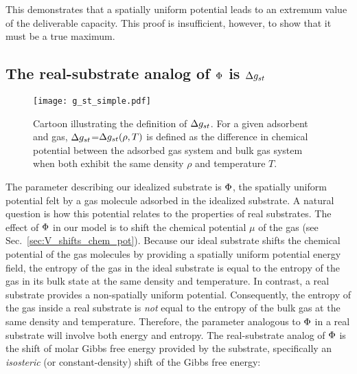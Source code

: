 This demonstrates that a spatially uniform potential leads to an extremum value
of the deliverable capacity. This proof is insufficient, however, to show that
it must be a true maximum.

\subsection{The real-substrate analog of $\Phi$ is $\Delta g_{st}$}
\label{sec:phi-is-delta-g}
\begin{figure}
    \centering
    \texttt{[image: g\_st\_simple.pdf]}
    \caption{Cartoon illustrating the definition of $\Delta g_{st}$. For a given adsorbent and gas, $\Delta g_{st}$=$\Delta g_{st} (\rho, T)$ is defined as the difference in chemical potential between the adsorbed gas system and bulk gas system when both exhibit the same density $\rho$ and temperature $T$.}
    \label{fig:delta-G-cartoon}
\end{figure}

The parameter describing our idealized substrate is $\Phi$, the spatially uniform
potential felt by a gas molecule adsorbed in the idealized substrate. A natural
question is how this potential relates to the properties of real substrates.
The effect of $\Phi$ in our model is to shift the chemical potential $\mu$ of the
gas (see Sec.~\ref{sec:V_shifts_chem_pot}). Because our ideal substrate shifts
the chemical potential of the gas molecules by providing a spatially uniform
potential energy field, the entropy of the gas in the ideal substrate is equal
to the entropy of the gas in its bulk state at the same density and
temperature. In contrast, a real substrate provides a non-spatially uniform
potential. Consequently, the entropy of the gas inside a real substrate is
\emph{not} equal to the entropy of the bulk gas at the same density and
temperature. Therefore, the parameter analogous to $\Phi$ in a real substrate
will involve both energy and entropy. The real-substrate analog of $\Phi$ is the
shift of molar Gibbs free energy provided by the substrate, specifically an
\emph{isosteric} (or constant-density) shift of the Gibbs free energy:

